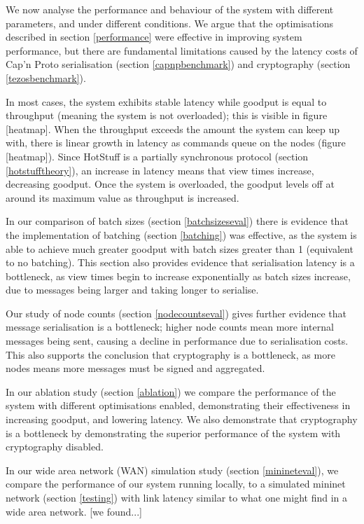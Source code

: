 We now analyse the performance and behaviour of the system with different parameters, and under different conditions. We argue that the optimisations described in section \ref{performance} were effective in improving system performance, but there are fundamental limitations caused by the latency costs of Cap'n Proto serialisation (section \ref{capnpbenchmark}) and cryptography (section \ref{tezosbenchmark}).

In most cases, the system exhibits stable latency while goodput is equal to throughput (meaning the system is not overloaded); this is visible in figure [heatmap]. When the throughput exceeds the amount the system can keep up with, there is linear growth in latency as commands queue on the nodes (figure [heatmap]). Since HotStuff is a partially synchronous protocol (section \ref{hotstufftheory}), an increase in latency means that view times increase, decreasing goodput. Once the system is overloaded, the goodput levels off at around its maximum value as throughput is increased.

In our comparison of batch sizes (section \ref{batchsizeseval}) there is evidence that the implementation of batching (section \ref{batching}) was effective, as the system is able to achieve much greater goodput with batch sizes greater than 1 (equivalent to no batching). This section also provides evidence that serialisation latency is a bottleneck, as view times begin to increase exponentially as batch sizes increase, due to messages being larger and taking longer to serialise.

Our study of node counts (section \ref{nodecountseval}) gives further evidence that message serialisation is a bottleneck; higher node counts mean more internal messages being sent, causing a decline in performance due to serialisation costs. This also supports the conclusion that cryptography is a bottleneck, as more nodes means more messages must be signed and aggregated.

In our ablation study (section \ref{ablation}) we compare the performance of the system with different optimisations enabled, demonstrating their effectiveness in increasing goodput, and lowering latency. We also demonstrate that cryptography is a bottleneck by demonstrating the superior performance of the system with cryptography disabled.

In our wide area network (WAN) simulation study (section \ref{minineteval}), we compare the performance of our system running locally, to a simulated mininet network (section \ref{testing}) with link latency similar to what one might find in a wide area network. [we found...]


